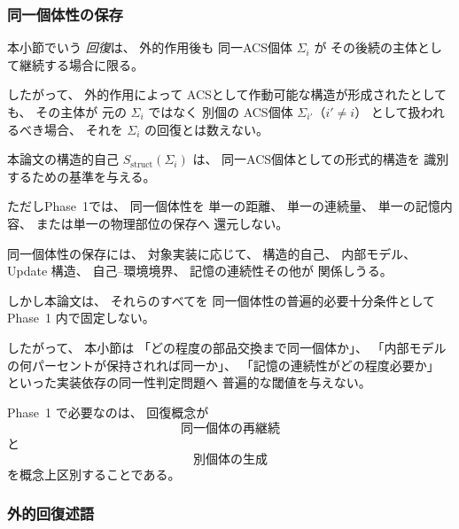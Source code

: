 \subsubsection{同一個体性の保存}

\begin{remark}[回復と別個体生成の区別]
\label{rem:same_identity}
本小節でいう
\emph{回復}は、
外的作用後も
同一ACS個体 $\Sigma_i$ が
その後続の主体として継続する場合に限る。

したがって、
外的作用によって
ACSとして作動可能な構造が形成されたとしても、
その主体が
元の $\Sigma_i$ ではなく
別個の ACS個体
$\Sigma_{i'}$（$i'\neq i$）
として扱われるべき場合、
それを
$\Sigma_i$ の回復とは数えない。

本論文の構造的自己
$S_{\mathrm{struct}}(\Sigma_i)$
は、
同一ACS個体としての形式的構造を
識別するための基準を与える。

ただしPhase~1では、
同一個体性を
単一の距離、
単一の連続量、
単一の記憶内容、
または単一の物理部位の保存へ
還元しない。
\end{remark}

\begin{remark}[同一個体性の判定を過剰形式化しない]
\label{rem:identity_scope}
同一個体性の保存には、
対象実装に応じて、
構造的自己、
内部モデル、
Update 構造、
自己--環境境界、
記憶の連続性その他が
関係しうる。

しかし本論文は、
それらのすべてを
同一個体性の普遍的必要十分条件として
Phase~1 内で固定しない。

したがって、
本小節は
「どの程度の部品交換まで同一個体か」、
「内部モデルの何パーセントが保持されれば同一か」、
「記憶の連続性がどの程度必要か」
といった実装依存の同一性判定問題へ
普遍的な閾値を与えない。

Phase~1 で必要なのは、
回復概念が
\[
  \text{同一個体の再継続}
\]
と
\[
  \text{別個体の生成}
\]
を概念上区別することである。
\end{remark}

\subsubsection{外的回復述語}

